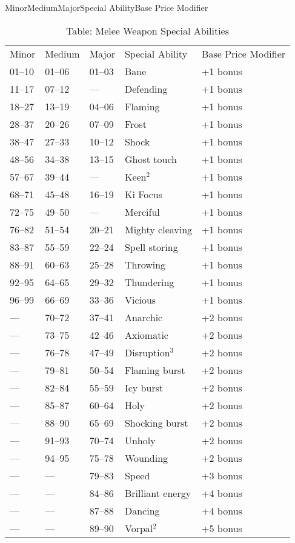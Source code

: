 MinorMediumMajorSpecial AbilityBase Price Modifier
\begin{table}[]
\caption{Table: Melee Weapon Special Abilities}
\begin{tabular}{lllll}
Minor & Medium & Major & Special Ability & Base Price Modifier\\
01–10 & 01–06 & 01–03 & Bane & +1 bonus\\
11–17 & 07–12 & — & Defending & +1 bonus\\
18–27 & 13–19 & 04–06 & Flaming & +1 bonus\\
28–37 & 20–26 & 07–09 & Frost & +1 bonus\\
38–47 & 27–33 & 10–12 & Shock & +1 bonus\\
48–56 & 34–38 & 13–15 & Ghost touch & +1 bonus\\
57–67 & 39–44 & — & Keen\(^{2}\) & +1 bonus\\
68–71 & 45–48 & 16–19 & Ki Focus & +1 bonus\\
72–75 & 49–50 & — & Merciful & +1 bonus\\
76–82 & 51–54 & 20–21 & Mighty cleaving & +1 bonus\\
83–87 & 55–59 & 22–24 & Spell storing & +1 bonus\\
88–91 & 60–63 & 25–28 & Throwing & +1 bonus\\
92–95 & 64–65 & 29–32 & Thundering & +1 bonus\\
96–99 & 66–69 & 33–36 & Vicious & +1 bonus\\
— & 70–72 & 37–41 & Anarchic & +2 bonus\\
— & 73–75 & 42–46 & Axiomatic & +2 bonus\\
— & 76–78 & 47–49 & Disruption\(^{3}\) & +2 bonus\\
— & 79–81 & 50–54 & Flaming burst & +2 bonus\\
— & 82–84 & 55–59 & Icy burst & +2 bonus\\
— & 85–87 & 60–64 & Holy & +2 bonus\\
— & 88–90 & 65–69 & Shocking burst & +2 bonus\\
— & 91–93 & 70–74 & Unholy & +2 bonus\\
— & 94–95 & 75–78 & Wounding & +2 bonus\\
— & — & 79–83 & Speed & +3 bonus\\
— & — & 84–86 & Brilliant energy & +4 bonus\\
— & — & 87–88 & Dancing & +4 bonus\\
— & — & 89–90 & Vorpal\(^{2}\) & +5 bonus\\

\end{tabular}
\end{table}
